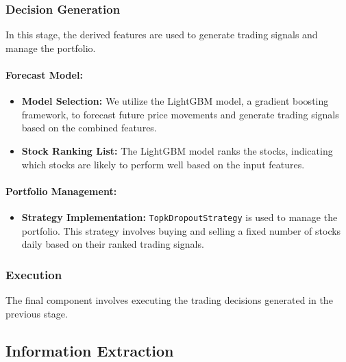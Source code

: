 \documentclass[conference]{IEEEtran}
\begin{document}
\subsubsection{Decision Generation}

In this stage, the derived features are used to generate trading signals and manage the portfolio.

\paragraph{Forecast Model:}
\begin{itemize}
    \item \textbf{Model Selection:} We utilize the LightGBM model, a gradient boosting framework, to forecast future price movements and generate trading signals based on the combined features.
    \item \textbf{Stock Ranking List:} The LightGBM model ranks the stocks, indicating which stocks are likely to perform well based on the input features.
\end{itemize}

\paragraph{Portfolio Management:}
\begin{itemize}
    \item \textbf{Strategy Implementation:} \texttt{TopkDropoutStrategy} is used to manage the portfolio. This strategy involves buying and selling a fixed number of stocks daily based on their ranked trading signals.
\end{itemize}

\subsubsection{Execution}

The final component involves executing the trading decisions generated in the previous stage.

\subsection{\textbf{Information Extraction}}
\end{document}
